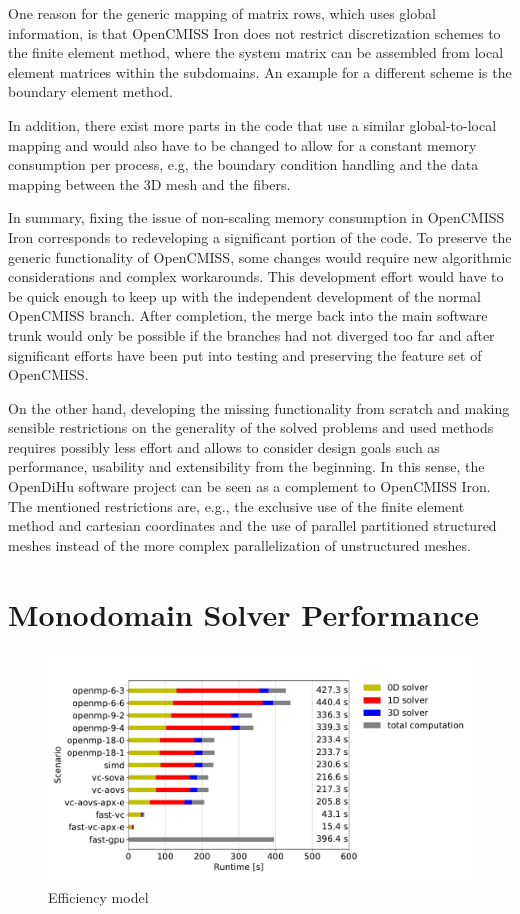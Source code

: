 One reason for the generic mapping of matrix rows, which uses global information, is that OpenCMISS Iron does not restrict discretization schemes to the finite element method, where the system matrix can be assembled from local element matrices within the subdomains. An example for a different scheme is the boundary element method.

In addition, there exist more parts in the code that use a similar global-to-local mapping and would also have to be changed to allow for a constant memory consumption per process, e.g, the boundary condition handling and the data mapping between the 3D mesh and the fibers.

In summary, fixing the issue of non-scaling memory consumption in OpenCMISS Iron corresponds to redeveloping a significant portion of the code. 
To preserve the generic functionality of OpenCMISS, some changes would require new algorithmic considerations and complex workarounds.
This development effort would have to be quick enough to keep up with the independent development of the normal OpenCMISS branch. After completion, the merge back into the main software trunk would only be possible if the branches had not diverged too far and after significant efforts have been put into testing and preserving the feature set of OpenCMISS.

On the other hand, developing the missing functionality from scratch and making sensible restrictions on the generality of the solved problems and used methods requires possibly less effort and allows to consider design goals such as performance, usability and extensibility from the beginning.
In this sense, the OpenDiHu software project can be seen as a complement to OpenCMISS Iron.  %
The mentioned restrictions are, e.g., the exclusive use of the finite element method and cartesian coordinates and the use of parallel partitioned structured meshes instead of the more complex parallelization of unstructured meshes.
\fi

\section{Monodomain Solver Performance}

\begin{figure}
  \centering%
  \includegraphics[width=\textwidth]{images/results/studies/fibers_emg_study.pdf}%
  \caption{Efficiency model}%
  \label{fig:fibers_emg_study}%
\end{figure}%

